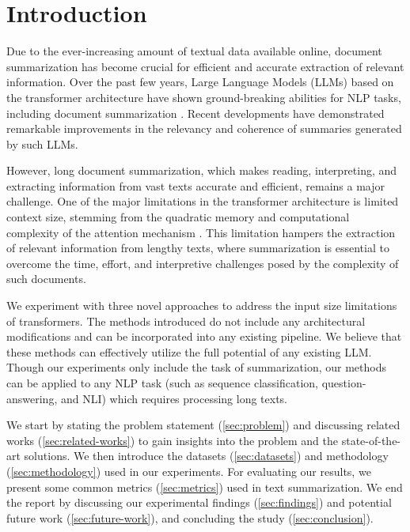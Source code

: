 \section{Introduction}
	\label{sec:introduction}

	Due to the ever-increasing amount of textual data available online, document summarization
	has become crucial for efficient and accurate extraction of relevant information.
	Over the past few years, Large Language Models (LLMs) based on the transformer architecture
	\cite{vaswani2017attention} have shown ground-breaking abilities for NLP tasks,
	including document summarization \cite{yadav2023state}.
	Recent developments have demonstrated remarkable improvements in the relevancy and
	coherence of summaries generated by such LLMs.

	However, long document summarization, which makes reading, interpreting, and extracting information
	from vast texts accurate and efficient, remains a major challenge.
	One of the major limitations in the transformer architecture is limited context size,
	stemming from the quadratic memory and computational complexity of the attention mechanism
	\cite{du2023improving}.
	This limitation hampers the extraction of relevant information from lengthy texts, where
	summarization is essential to overcome the time, effort, and interpretive challenges posed by
	the complexity of such documents.

	We experiment with three novel approaches to address the input size limitations of transformers.
	The methods introduced do not include any architectural modifications and can be incorporated
	into any existing pipeline.
	We believe that these methods can effectively utilize the full potential of any existing LLM.
	Though our experiments only include the task of summarization, our methods can be applied
	to any NLP task (such as sequence classification, question-answering, and NLI) which requires
	processing long texts.

	We start by stating the problem statement (\autoref{sec:problem}) and discussing related works
	(\autoref{sec:related-works}) to gain insights into the problem and the state-of-the-art solutions.
	We then introduce the datasets (\autoref{sec:datasets}) and methodology (\autoref{sec:methodology})
	used in our experiments.
	For evaluating our results, we present some common metrics (\autoref{sec:metrics}) used in text
	summarization.
	We end the report by discussing our experimental findings (\autoref{sec:findings}) and potential
	future work (\autoref{sec:future-work}), and concluding the study (\autoref{sec:conclusion}).
